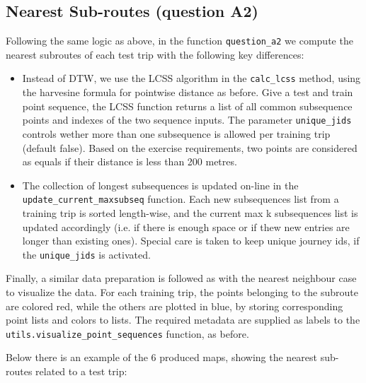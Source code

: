 \documentclass[12pt]{article}
\begin{document}
	\subsection{Nearest Sub-routes (question A2)}
	Following the same logic as above, in the function \texttt{question\_a2} we
  compute the nearest subroutes of each test trip with the following key
  differences:
  \begin{itemize}
    \item Instead of DTW, we use the LCSS algorithm in the \texttt{calc\_lcss}
      method, using the harvesine formula for pointwise distance as before. Give
      a test and train point sequence, the LCSS function returns a list of all
      common subsequence points and indexes of the two sequence inputs. The
      parameter \texttt{unique\_jids} controls wether more than one subsequence
      is allowed per training trip (default false). Based on the exercise
      requirements, two points are considered as equals if their distance is less than 200 metres.

      \item The collection of longest subsequences is updated on-line in the
        \\ \texttt{update\_current\_maxsubseq} function. Each new subsequences list
        from a training trip is sorted length-wise, and the current max k
        subsequences list is updated accordingly (i.e. if there is enough space
        or if thew new entries are longer than existing ones). Special care is
        taken to keep unique journey ids, if the \texttt{unique\_jids} is activated.
      \end{itemize}
	
	Finally, a similar data preparation is followed as with the nearest neighbour
  case to visualize the data. For each training trip, the points belonging to
  the subroute are colored red, while the others are plotted in blue, by storing
  corresponding point lists and colors to lists. The required metadata are
  supplied as labels to the \texttt{utils.visualize\_point\_sequences} function,
  as before.
	
	Below there is an example of the 6 produced maps, showing the nearest sub-routes related to a test trip:
	
\end{document}
